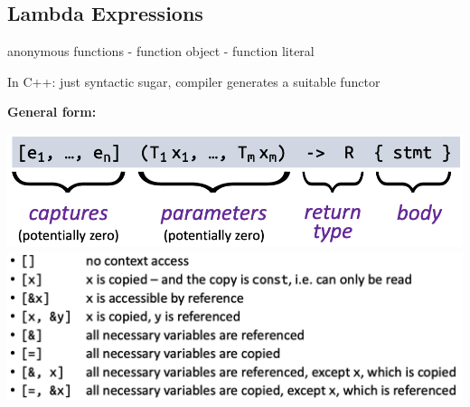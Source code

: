 \begin{sectionbox}
\subsection{Lambda Expressions}\smallskip
anonymous functions - function object - function literal\par
In C++: just syntactic sugar, compiler generates a suitable functor

\textbf{General form:}
\begin{center} 
    \includegraphics[width=\columnwidth]{img/Lambda.png}
    \includegraphics[width=\columnwidth]{img/LambdaCaptures.png}
\end{center}
\end{sectionbox}
